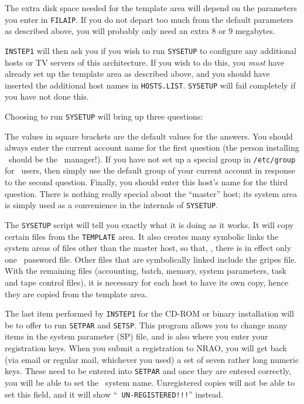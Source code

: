 The extra disk space needed for the template area will depend on the
parameters you enter in {\tt FILAIP}.  If you do not depart too much
from the default parameters as described above, you will probably only
need an extra 8 or 9 megabytes.

{\tt INSTEP1} will then ask you if you wish to run {\tt SYSETUP} to
configure any additional hosts or TV servers of this architecture.  If
you wish to do this, you {\it must\/} have already set up the template
area as described above, and you should have inserted the additional
host names in {\tt HOSTS.LIST}.  {\tt SYSETUP} will fail completely if
you have not done this.

Choosing to run {\tt SYSETUP} will bring up three questions:\medskip

\medskip

\noindent
The values in square brackets are the default values for the answers.
You should always enter the current account name for the first question
(the person installing \AIPS\ should be the \AIPS\ manager!).  If you
have not set up a special group in {\tt /etc/group} for \AIPS\ users,
then simply use the default group of your current account in response to
the second question.  Finally, you should enter this host's name for the
third question.  There is nothing really special about the ``master''
host; its system area is simply used as a convenience in the internals
of {\tt SYSETUP}.

The {\tt SYSETUP} script will tell you exactly what it is doing as it
works.  It will copy certain files from the {\tt TEMPLATE} area.  It
also creates many symbolic links the system areas of files other than
the master host, so that, \eg, there is in effect only one
\AIPS\ password file.  Other files that are symbolically linked include
the gripes file.  With the remaining files (accounting, batch, memory,
system parameters, task and tape control files), it is necessary for
each host to have its own copy, hence they are copied from the template
area.

\medskip{}

The last item performed by {\tt INSTEP1} for the CD-ROM or binary
installation will be to offer to run {\tt SETPAR} and {\tt SETSP}.  This
program allows you to change many items in the system parameter (SP)
file, and is also where you enter your registration keys.  When you
submit a registration to NRAO, you will get back (via email or regular
mail, whichever you used) a set of seven rather long numeric keys.
These need to be entered into {\tt SETPAR} and once they are entered
correctly, you will be able to set the \AIPS\ system name.  Unregistered
copies will not be able to set this field, and it will show ``{\tt
UN-REGISTERED!!!}'' instead.

